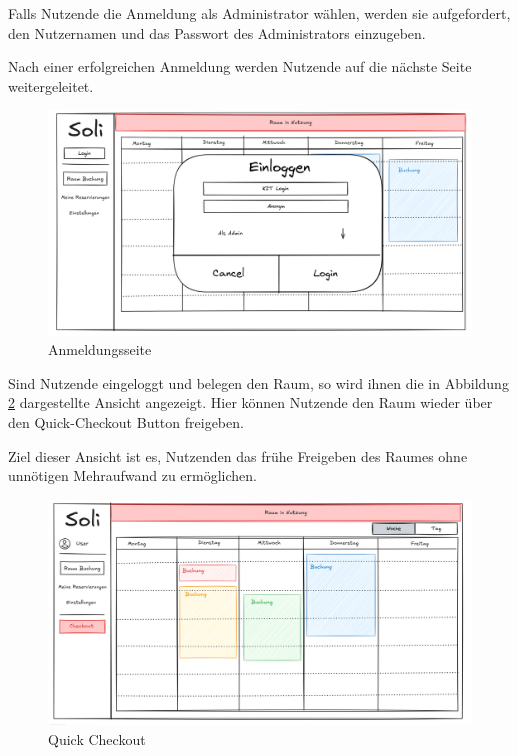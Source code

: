 Falls Nutzende die Anmeldung als Administrator wählen, werden sie aufgefordert, den Nutzernamen und das Passwort des Administrators einzugeben.

Nach einer erfolgreichen Anmeldung werden Nutzende auf die nächste Seite weitergeleitet.
\begin{figure}[ht]
    \centering
    \includegraphics[scale=0.15]{figures/ui/anmeldungsseite}
    \caption{Anmeldungsseite}
    \label{fig:login}
\end{figure}
\clearpage

Sind Nutzende eingeloggt und belegen den Raum,
so wird ihnen die in Abbildung \ref{fig:checkout} dargestellte Ansicht angezeigt.
Hier können Nutzende den Raum wieder über den Quick-Checkout Button freigeben.

Ziel dieser Ansicht ist es, Nutzenden das frühe Freigeben des Raumes ohne unnötigen Mehraufwand zu ermöglichen.
\begin{figure}[ht]
    \centering
    \includegraphics[scale=0.15]{figures/ui/checkout}
    \caption{Quick Checkout}
    \label{fig:checkout}
\end{figure}
\clearpage

